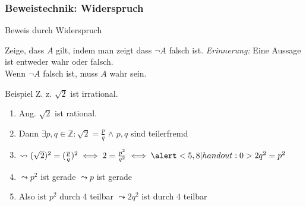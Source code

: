 \subsubsection{Beweistechnik: Widerspruch}
\begin{frame}[fragile]{Beweis durch Widerspruch}
\small{
    \begin{alertblock}{Zeige, dass $A$ gilt, indem man zeigt dass $\neg A$ falsch ist.}
    \emph{Erinnerung:} Eine Aussage ist entweder wahr oder falsch.\\
    Wenn $\neg A$ falsch ist, muss $A$ wahr sein.
    \end{alertblock}
    \begin{exampleblock}{Beispiel}
        Z. z. $\sqrt{2}$ ist irrational.
        \begin{enumerate}
            \item<1-|handout:1> \alert<1|handout:0>{Ang. $\sqrt{2}$ ist rational.}
            \item<2-|handout:1> \alert<2|handout:0>{Dann $\exists p, q \in \mathbb{Z} : \sqrt{2} = \frac{p}{q}$} $\wedge$ \alert<3,11|handout:0>{$p, q$ sind teilerfremd}
            \item<4-|handout:1> $\leadsto(\sqrt{2})^2 = (\frac{p}{q})^2 \iff 2 = \frac{p^2}{q^2} \iff \alert<5,8|handout:0>{2q^2=p^2}$
            \item<5-|handout:1> \alert<5|handout:0>{$\leadsto p^2$ ist gerade} \alert<6,10|handout:0>{$\leadsto p$ ist gerade}
            \item<7-|handout:1> \alert<7|handout:0>{Also ist $p^2$ durch 4 teilbar} \alert<8|handout:0>{$\leadsto 2q^2$ ist durch 4 teilbar}

\end{enumerate}
\end{exampleblock}}
\end{frame}
